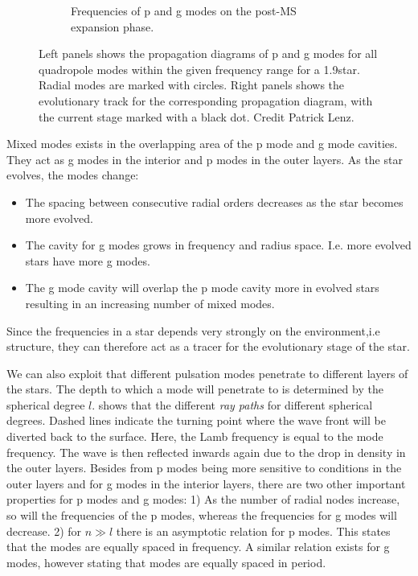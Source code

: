 \begin{figure}
\begin{subfigure}[b]{1\textwidth}
		\caption{Frequencies of p and g modes on the post-MS expansion phase. }
		\label{fig:five over x}
	\end{subfigure}
	\caption{ Left panels shows the propagation diagrams of p and g modes for all quadropole modes within the given frequency range for a 1.9\msun star. Radial modes are marked with circles. Right panels shows the evolutionary track for the corresponding propagation diagram, with the current stage marked with a black dot. Credit Patrick Lenz.  }
	\label{pandg}
\end{figure}


Mixed modes exists in the overlapping area of the p mode and g mode cavities. They act as g modes in the interior and p modes in the outer layers. As the star evolves, the modes change:

\begin{itemize} 
	\item The spacing between consecutive radial orders decreases as the star becomes more evolved.
	\item The cavity for g modes grows in frequency and radius space. I.e. more evolved stars have more g modes.
	\item The g mode cavity will overlap the p mode cavity more in evolved stars resulting in an increasing number of mixed modes.  
\end{itemize}

Since the frequencies in a star depends very strongly on the environment,i.e structure, they can therefore act as a tracer for the evolutionary stage of the star. 
 
We can also exploit that different pulsation modes penetrate to different layers of the stars. The depth to which a mode will penetrate to is determined by the spherical degree $l$.  shows that the different \textit{ray paths} for different spherical degrees. Dashed lines indicate the turning point where the wave front will be diverted back to the surface. Here, the Lamb frequency is equal to the mode frequency. The wave is then reflected inwards again due to the drop in density in the outer layers. Besides from p modes being more sensitive to conditions in the outer layers and for g modes in the interior layers, there are two other important properties for p modes and g modes: 1) As the number of radial nodes increase, so will the frequencies of the p modes, whereas the frequencies for g modes will decrease. 2) for $n\gg l$ there is an asymptotic relation for p modes. This states that the modes are equally spaced in frequency. A similar relation exists for g modes, however stating that modes are equally spaced in period. 

